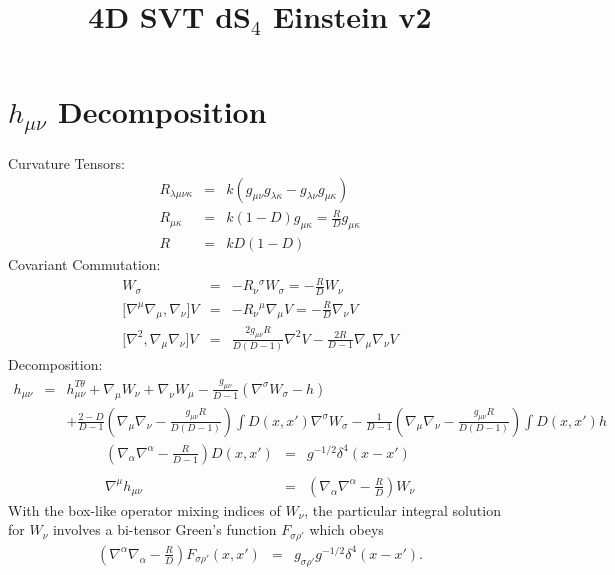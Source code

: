 \documentclass[10pt,letterpaper]{article}
\title{4D SVT dS${}_4$ Einstein v2}
\date{}
\numberwithin{equation}{section}
\begin{document}
 
\maketitle
\noindent 
\section{$h_{\mu\nu}$ Decomposition}
Curvature Tensors:
\begin{eqnarray}
R_{\lambda\mu\nu\kappa} &=& k(g_{\mu\nu}g_{\lambda\kappa}-g_{\lambda\nu}g_{\mu\kappa})
\nonumber\\
R_{\mu\kappa} &=& k(1-D)g_{\mu\kappa} = \frac{R}{D}g_{\mu\kappa}
\nonumber\\
R&=& kD(1-D) 
\end{eqnarray}
Covariant Commutation:
\begin{eqnarray}
[\nabla^\sigma \nabla_\nu] W_\sigma &=& -R_{\nu}{}^\sigma W_\sigma = -\frac{R}{D}W_\nu
\nonumber\\
{[}\nabla^\mu \nabla_\mu, \nabla_\nu] V &=& -R_{\nu}{}^\mu \nabla_\mu V = -\frac{R}{D}\nabla_\nu V
\nonumber\\
{[}\nabla^2,\nabla_\mu\nabla_\nu]V &=& \frac{2 g_{\mu\nu}R}{D(D-1)}\nabla^2 V - \frac{2R}{D-1}\nabla_\mu\nabla_\nu V
\label{comms}
\end{eqnarray}
Decomposition:
\begin{eqnarray}
h_{\mu\nu} &=& h_{\mu\nu}^{T\theta} + \nabla_\mu W_\nu + \nabla_\nu W_\mu - \frac{g_{\mu\nu}}{D-1}(\nabla^\sigma W_\sigma - h)
\nonumber\\
&& +\frac{2-D}{D-1}\left( \nabla_\mu\nabla_\nu -\frac{ g_{\mu\nu}R}{D(D-1)}\right) \int D(x,x') \nabla^\sigma W_\sigma
-\frac{1}{D-1}\left( \nabla_\mu\nabla_\nu -\frac{g_{\mu\nu}R}{D(D-1)}\right) \int D(x,x') h
\label{decomph}
\end{eqnarray}
\begin{eqnarray}
\left( \nabla_\alpha \nabla^\alpha - \frac{R}{D-1}\right)D(x,x') &=& g^{-1/2}\delta^4 (x-x')
\nonumber\\ \nonumber\\
\nabla^\mu h_{\mu\nu} &=& \left( \nabla_\alpha\nabla^\alpha-\frac{R}{D} \right) W_\nu
\end{eqnarray}
With the box-like operator mixing indices of $W_\nu$, the particular integral solution for $W_\nu$ involves a bi-tensor Green's function $F_{\sigma\rho'}$ which obeys
\begin{eqnarray}
\left( \nabla^\alpha\nabla_\alpha -\frac{R}{D}\right) F_{\sigma\rho'}(x,x') &=& g_{\sigma\rho'}g^{-1/2} \delta^4(x-x').
\label{fgreen}
\end{eqnarray}
\end{document}
